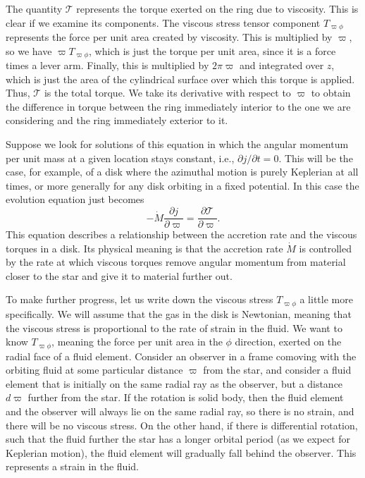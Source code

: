 The quantity $\mathcal{T}$ represents the torque exerted on the ring due to viscosity. This is clear if we examine its components. The viscous stress tensor component $T_{\varpi\phi}$ represents the force per unit area created by viscosity. This is multiplied by $\varpi$, so we have $\varpi T_{\varpi\phi}$, which is just the torque per unit area, since it is a force times a lever arm. Finally, this is multiplied by $2\pi \varpi$ and integrated over $z$, which is just the area of the cylindrical surface over which this torque is applied. Thus, $\mathcal{T}$ is the total torque. We take its derivative with respect to $\varpi$ to obtain the difference in torque between the ring immediately interior to the one we are considering and the ring immediately exterior to it. 

Suppose we look for solutions of this equation in which the angular momentum per unit mass at a given location stays constant, i.e., $\partial j/\partial t=0$. This will be the case, for example, of a disk where the azimuthal motion is purely Keplerian at all times, or more generally for any disk orbiting in a fixed potential. In this case the evolution equation just becomes
\begin{equation}
\label{eq:angmom_disk}
-\dot{M} \frac{\partial j}{\partial \varpi} = \frac{\partial \mathcal{T}}{\partial \varpi}.
\end{equation}
This equation describes a relationship between the accretion rate and the viscous torques in a disk. Its physical meaning is that the accretion rate $\dot{M}$ is controlled by the rate at which viscous torques remove angular momentum from material closer to the star and give it to material further out. 

To make further progress, let us write down the viscous stress $T_{\varpi\phi}$ a little more specifically. We will assume that the gas in the disk is Newtonian, meaning that the viscous stress is proportional to the rate of strain in the fluid. We want to know $T_{\varpi\phi}$, meaning the force per unit area in the $\phi$ direction, exerted on the radial face of a fluid element. Consider an observer in a frame comoving with the orbiting fluid at some particular distance $\varpi$ from the star, and consider a fluid element that is initially on the same radial ray as the observer, but a distance $d\varpi$ further from the star. If the rotation is solid body, then the fluid element and the observer will always lie on the same radial ray, so there is no strain, and there will be no viscous stress. On the other hand, if there is differential rotation, such that the fluid further the star has a longer orbital period (as we expect for Keplerian motion), the fluid element will gradually fall behind the observer. This represents a strain in the fluid.

